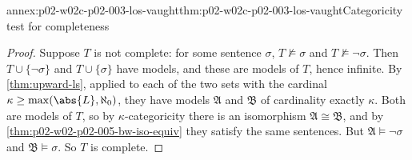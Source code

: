 \begin{annexitem}{annex:p02-w02c-p02-003-los-vaught}{thm:p02-w02c-p02-003-los-vaught}{Categoricity test for completeness}
\begin{proof}
Suppose \(T\) is not complete: for some sentence \(\sigma\),
\(T\not\models\sigma\) and \(T\not\models\neg\sigma\).  Then
\(T\cup\{\neg\sigma\}\) and \(T\cup\{\sigma\}\) have models, and these are
models of \(T\), hence infinite.  By \cref{thm:upward-ls}, applied to
each of the two sets with the cardinal
\(\kappa\geq\max(\abs{L},\aleph_0)\), they have models
\(\mathfrak A\) and \(\mathfrak B\) of cardinality exactly \(\kappa\).
Both are models of \(T\), so by \(\kappa\)-categoricity there is an
isomorphism \(\mathfrak A\cong\mathfrak B\), and by
\cref{thm:p02-w02-p02-005-bw-iso-equiv} they satisfy the same sentences.
But \(\mathfrak A\models\neg\sigma\) and \(\mathfrak B\models\sigma\).  So
\(T\) is complete.
\end{proof}
\end{annexitem}


